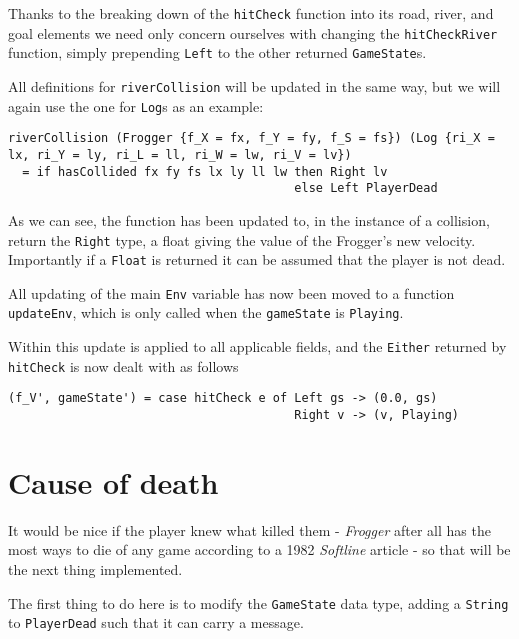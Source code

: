 \documentclass[12pt, a4paper]{report}
\begin{document}
Thanks to the breaking down of the \verb|hitCheck| function into its road, river, and goal elements we need only concern ourselves with changing the \verb|hitCheckRiver| function, simply prepending \verb|Left| to the other returned \verb|GameState|s.

All definitions for \verb|riverCollision| will be updated in the same way, but we will again use the one for \verb|Log|s as an example:

\begin{lstlisting}
riverCollision (Frogger {f_X = fx, f_Y = fy, f_S = fs}) (Log {ri_X = lx, ri_Y = ly, ri_L = ll, ri_W = lw, ri_V = lv})
  = if hasCollided fx fy fs lx ly ll lw then Right lv
                                        else Left PlayerDead

\end{lstlisting}

As we can see, the function has been updated to, in the instance of a collision, return the \verb|Right| type, a float giving the value of the Frogger's new velocity.
Importantly if a \verb|Float| is returned it can be assumed that the player is not dead.

\par

All updating of the main \verb|Env| variable has now been moved to a function \verb|updateEnv|, which is only called when the \verb|gameState| is \verb|Playing|.

Within this update is applied to all applicable fields, and the \verb|Either| returned by \verb|hitCheck| is now dealt with as follows

\begin{lstlisting}
(f_V', gameState') = case hitCheck e of Left gs -> (0.0, gs)
                                        Right v -> (v, Playing)
\end{lstlisting}

\section{Cause of death}

It would be nice if the player knew what killed them - \textit{Frogger} after all has the most ways to die of any game according to a 1982 \textit{Softline} article - so that will be the next thing implemented.

The first thing to do here is to modify the \verb|GameState| data type, adding a \verb|String| to \verb|PlayerDead| such that it can carry a message.
\end{document}
